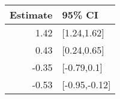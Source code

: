 \begin{tabular}{rl}
  \hline
Estimate & 95\% CI \\ 
  \hline
1.42 & [1.24,1.62] \\ 
  0.43 & [0.24,0.65] \\ 
  -0.35 & [-0.79,0.1] \\ 
  -0.53 & [-0.95,-0.12] \\ 
   \hline
\end{tabular}

